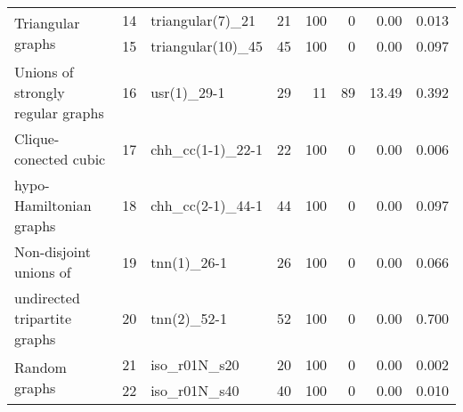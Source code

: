 \documentclass
[
    a4paper,
    DIV=11,
    abstracton
]
{scrartcl}
\theoremstyle{definition}
\begin{document}
\begin{table}[htb]
\begin{tabular}{|l|r|l|r|r|r|r|r|}
        \multirow{2}{*}{Triangular graphs}                                      & 14 & triangular(7)\_21  & 21 & 100 &   0 &  0.00 &  0.013 \\ & 15 & triangular(10)\_45 & 45 & 100 &   0 &  0.00 &  0.097 \\ \hline
Unions of strongly regular graphs                                       & 16 & usr(1)\_29-1       & 29 &  11 &  89 & 13.49 &  0.392 \\ \hline Clique-conected cubic                                                   & 17 & chh\_cc(1-1)\_22-1 & 22 & 100 &   0 &  0.00 &  0.006 \\ hypo-Hamiltonian graphs                                                 & 18 & chh\_cc(2-1)\_44-1 & 44 & 100 &   0 &  0.00 &  0.097 \\ \hline
        Non-disjoint unions of                                                  & 19 & tnn(1)\_26-1       & 26 & 100 &   0 &  0.00 &  0.066 \\ undirected tripartite graphs                                            & 20 & tnn(2)\_52-1       & 52 & 100 &   0 &  0.00 &  0.700 \\ \hline
\multirow{2}{*}{Random graphs}                                          & 21 & iso\_r01N\_s20     & 20 & 100 &   0 &  0.00 &  0.002 \\ & 22 & iso\_r01N\_s40     & 40 & 100 &   0 &  0.00 &  0.010 \\
        \hline
    \end{tabular}
    \label{tab:BenchmarkResults}
\end{table}
\end{document}
